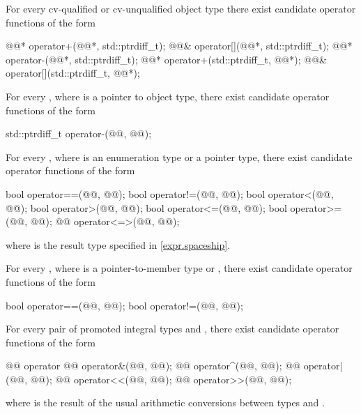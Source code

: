 \pnum
For every cv-qualified or cv-unqualified object type
there exist candidate operator functions of the form
\begin{codeblock}
@@*      operator+(@@*, std::ptrdiff_t);
@@&      operator[](@@*, std::ptrdiff_t);
@@*      operator-(@@*, std::ptrdiff_t);
@@*      operator+(std::ptrdiff_t, @@*);
@@&      operator[](std::ptrdiff_t, @@*);
\end{codeblock}

\pnum
For every
,
where
is a pointer to object type,
there exist candidate operator functions of the form
\begin{codeblock}
std::ptrdiff_t   operator-(@@, @@);
\end{codeblock}

\pnum
For every , where  is an enumeration type or a pointer type,
there exist candidate operator functions of the form
\begin{codeblock}
bool    operator==(@@, @@);
bool    operator!=(@@, @@);
bool    operator<(@@, @@);
bool    operator>(@@, @@);
bool    operator<=(@@, @@);
bool    operator>=(@@, @@);
@@       operator<=>(@@, @@);
\end{codeblock}
where  is the result type specified in \ref{expr.spaceship}.

\pnum
For every , where 
is a pointer-to-member type or ,
there exist candidate operator functions of the form
\begin{codeblock}
bool operator==(@@, @@);
bool operator!=(@@, @@);
\end{codeblock}

\pnum
For every pair of promoted integral types
and
,
there exist candidate operator functions of the form
\begin{codeblock}
@@      operator%
@@      operator&(@@, @@);
@@      operator^(@@, @@);
@@      operator|(@@, @@);
@@       operator<<(@@, @@);
@@       operator>>(@@, @@);
\end{codeblock}
where
is the result of the usual arithmetic conversions between types
and
.

